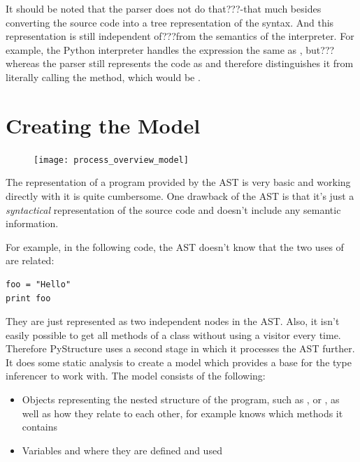 \documentclass[12pt,halfparskip,DIV11,BCOR10mm]{scrreprt}
\begin{document}
It should be noted that the parser does not do that???-that much besides converting the source code into a tree representation of the syntax. And this representation is still independent of???from the semantics of the interpreter. For example, the Python interpreter handles the expression  the same as , but???whereas the parser still represents the code as  and therefore distinguishes it from literally calling the  method, which would be .


\section{Creating the Model}
\label{creating_the_model}

\begin{figure}
    \vspace{-0.7cm}
    \texttt{[image: process\_overview\_model]}
    \vspace{-1cm}
\end{figure}

The representation of a program provided by the AST is very basic and working directly with it is quite cumbersome. 
One drawback of the AST is that it's just a \emph{syntactical} representation of the source code and doesn't include any semantic information.

For example, in the following code, the AST doesn't know that the two uses of  are related:

\begin{lstlisting}
foo = "Hello"
print foo
\end{lstlisting}

They are just represented as two independent  nodes in the AST. Also, it isn't easily possible to get all methods of a class without using a visitor every time. Therefore PyStructure uses a second stage in which it processes the AST further. It does some static analysis to create a model which provides a base for the type inferencer to work with. The model consists of the following:

\begin{itemize}
    \item Objects representing the nested structure of the program, such as ,  or , as well as how they relate to each other, for example  knows which methods it contains
    \item Variables and where they are defined and used
\end{itemize}
\end{document}
